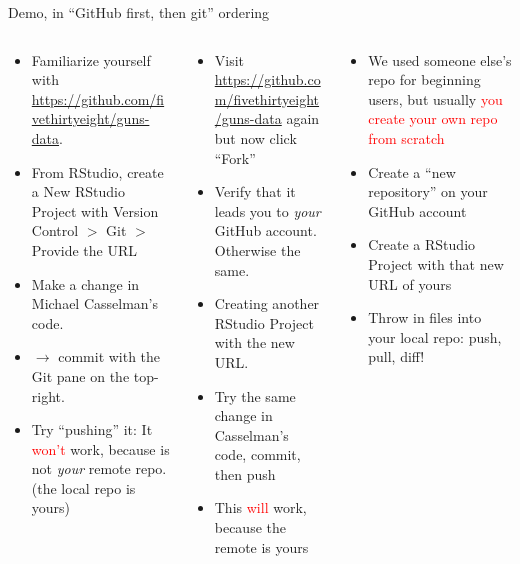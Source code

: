 \documentclass[ignorenonframetext, 10pt, aspectratio=169]{beamer}
\begin{document}
\begin{frame}{Demo, in ``GitHub first, then git'' ordering}
\begin{columns}[T]
\begin{column}{0.33\textwidth}
\footnotesize
\begin{itemize}
\item Familiarize yourself with \url{https://github.com/fivethirtyeight/guns-data}.
\item From RStudio, create a New RStudio Project with Version Control $>$ Git $>$ Provide the URL
\item Make a change in Michael Casselman's code. 
\item $\rightarrow$ commit with the Git pane on the top-right.
\item Try ``pushing'' it: It \textcolor{red}{won't} work, because  is not \emph{your} remote repo. (the local repo is yours)
\end{itemize}
\end{column}
\begin{column}{0.33\textwidth}
\footnotesize
\begin{itemize}
  \item Visit \url{https://github.com/fivethirtyeight/guns-data} again but now click ``Fork''
  \item Verify that it leads you to \emph{your} GitHub account. Otherwise the same.
  \item Creating another RStudio Project with the new URL. 
  \item Try the same change in Casselman's code, commit, then push
  \item This \textcolor{red}{will} work, because the remote is yours
\end{itemize}
\end{column}
\begin{column}{0.33\textwidth}
\footnotesize
\begin{itemize}
\item We used someone else's repo for beginning users, but usually \textcolor{red}{you create your own repo from scratch}
\item Create a ``new repository'' on your GitHub account
\item Create a RStudio Project with that new URL of yours
\item Throw in files into your local repo: push, pull, diff!
\end{itemize}
\end{column}
\end{columns}
\end{frame}
\end{document}
